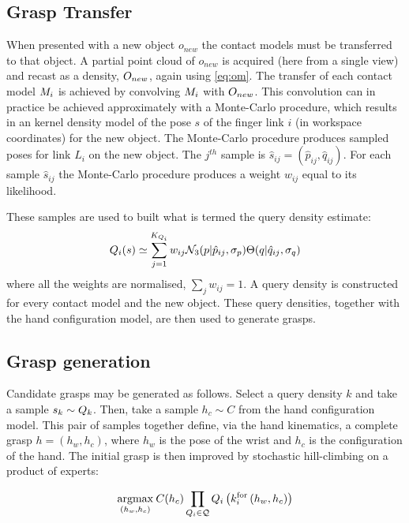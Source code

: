 \subsection{Grasp Transfer}
When presented with a new object $o_{new}$ the contact models must be transferred to that object.  A partial point cloud of $o_{new}$ is acquired (here from a single view) and recast as a density, $O_{new}$, again using \eq \ref{eq:om}. The transfer of each contact model $M_i$ is achieved by convolving $M_i$ with $O_{new}$. This convolution can in practice be achieved approximately with a Monte-Carlo procedure, which results in an kernel density model of the pose $s$ of the finger link $i$ (in workspace coordinates) for the new object. The Monte-Carlo procedure produces sampled poses for link $L_i$ on the new object. The $j^{th}$ sample is $\hat{s}_{ij}=(\hat{p}_{ij},\hat{q}_{ij})$. For each sample $\hat{s}_{ij}$ the Monte-Carlo procedure produces a weight $w_{ij}$ equal to its likelihood.

These samples are used to built what is termed the query density estimate:
\begin{equation}
\qd_i(s) \simeq \sum^{K_{Q_i}}_{j=1} w_{ij} \mathcal{N}_3(p|{\hat{p}_{ij}}, \sigma_{p}) \Theta(q|{\hat{q}_{ij}}, \sigma_{q})%
\label{eq:qd.approx}
\end{equation}
where all the weights are normalised, $\sum_j w_{ij} = 1$. A query density is constructed for every contact model and the new object. These query densities, together with the hand configuration model, are then used to generate grasps.

\subsection{Grasp generation}
Candidate grasps may be generated as follows. Select a query density $k$ and take a sample  $s_k \sim Q_{k}$. Then, take a sample $h_c \sim C$ from the hand configuration model. This pair of samples together define, via the hand kinematics, a complete grasp $h=(h_w,h_c)$, where $h_w$ is the pose of the wrist and $h_c$ is the configuration of the hand. The initial grasp is then improved by stochastic hill-climbing on a product of experts:

\begin{equation}
\argmax{(h_w, h_c)} \hc(h_c) \prod_{\qd_i \in \mathcal{Q}} \qd_i\left(k_{i}^{\mathrm{for}}\left(h_w, h_c\right)\right)
\label{eq:grasping.product}
\end{equation}

